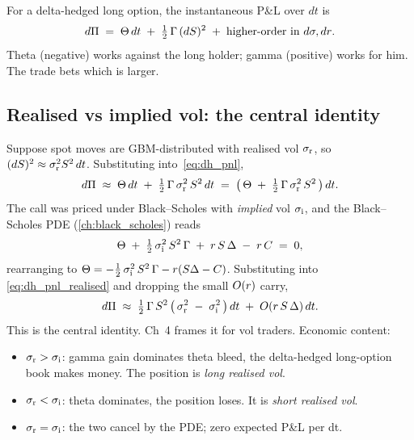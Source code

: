 \begin{keyfactbox}
For a delta-hedged long option, the instantaneous P\&L over $dt$ is
\begin{equation}
  d\Pi \;=\; \Theta\,dt \;+\; \tfrac12\,\Gamma\,(dS)^2
                  \;+\; \text{higher-order in $d\sigma, dr$}.
  \label{eq:dh_pnl}
\end{equation}
Theta (negative) works against the long holder; gamma (positive)
works for him. The trade bets which is larger.
\end{keyfactbox}

\subsection{Realised vs implied vol: the central identity}
\label{subsec:ch16_realised_vs_implied}

Suppose spot moves are GBM-distributed with realised vol
$\sigma_{\text{r}}$, so $(dS)^2 \approx \sigma_{\text{r}}^2
S^2\,dt$. Substituting into~\eqref{eq:dh_pnl},
\begin{equation}
  d\Pi \;\approx\; \Theta\,dt \;+\; \tfrac12\,\Gamma\,\sigma_{\text{r}}^2\,S^2\,dt
       \;=\; \bigl(\,\Theta \;+\; \tfrac12\,\Gamma\,\sigma_{\text{r}}^2\,S^2\,\bigr)\,dt.
  \label{eq:dh_pnl_realised}
\end{equation}
The call was priced under Black--Scholes with \emph{implied} vol
$\sigma_{\text{i}}$, and the Black--Scholes PDE
(\cref{ch:black_scholes}) reads
\begin{equation}
  \Theta \;+\; \tfrac12\,\sigma_{\text{i}}^2\,S^2\,\Gamma
        \;+\; r\,S\,\Delta \;-\; r\,C \;=\; 0,
  \label{eq:bs_pde_recall}
\end{equation}
rearranging to $\Theta = -\tfrac12\,\sigma_{\text{i}}^2\,S^2\,
\Gamma - r(S\Delta - C)$. Substituting into
\eqref{eq:dh_pnl_realised} and dropping the small $O(r)$ carry,
\begin{equation}
  d\Pi \;\approx\; \tfrac12\,\Gamma\,S^2\,
                   \bigl(\,\sigma_{\text{r}}^2 \;-\; \sigma_{\text{i}}^2\,\bigr)\,dt
       \;+\; O(r\,S\,\Delta)\,dt.
  \label{eq:dh_pnl_vol_diff}
\end{equation}
This is the central identity. \citeBennett Ch~4 frames it for vol
traders. Economic content:

\begin{itemize}
  \item $\sigma_{\text{r}} > \sigma_{\text{i}}$: gamma gain
  dominates theta bleed, the delta-hedged long-option book makes
  money. The position is \emph{long realised vol}.
  \item $\sigma_{\text{r}} < \sigma_{\text{i}}$: theta dominates,
  the position loses. It is \emph{short realised vol}.
  \item $\sigma_{\text{r}} = \sigma_{\text{i}}$: the two cancel by
  the PDE; zero expected P\&L per dt.
\end{itemize}

